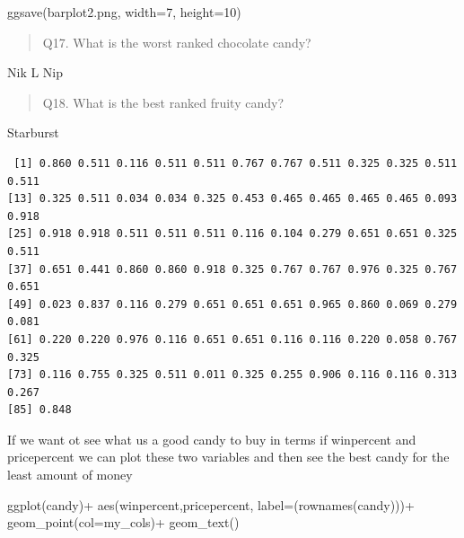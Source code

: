 \documentclass[
  letterpaper,
  DIV=11,
  numbers=noendperiod]{scrartcl}
\newenvironment{Shaded}{\begin{snugshade}}{\end{snugshade}}
\newcommand{\AttributeTok}[1]{\textcolor[rgb]{0.40,0.45,0.13}{#1}}
\newcommand{\DecValTok}[1]{\textcolor[rgb]{0.68,0.00,0.00}{#1}}
\newcommand{\FunctionTok}[1]{\textcolor[rgb]{0.28,0.35,0.67}{#1}}
\newcommand{\NormalTok}[1]{\textcolor[rgb]{0.00,0.23,0.31}{#1}}
\newcommand{\SpecialCharTok}[1]{\textcolor[rgb]{0.37,0.37,0.37}{#1}}
\newcommand{\StringTok}[1]{\textcolor[rgb]{0.13,0.47,0.30}{#1}}
\begin{document}
\begin{Shaded}
\begin{Highlighting}[]
\FunctionTok{ggsave}\NormalTok{(}\StringTok{\textquotesingle{}barplot2.png\textquotesingle{}}\NormalTok{, }\AttributeTok{width=}\DecValTok{7}\NormalTok{, }\AttributeTok{height=}\DecValTok{10}\NormalTok{)}
\end{Highlighting}
\end{Shaded}

\begin{quote}
Q17. What is the worst ranked chocolate candy?
\end{quote}

Nik L Nip

\begin{quote}
Q18. What is the best ranked fruity candy?
\end{quote}

Starburst

\begin{Shaded}
\end{Shaded}

\begin{verbatim}
 [1] 0.860 0.511 0.116 0.511 0.511 0.767 0.767 0.511 0.325 0.325 0.511 0.511
[13] 0.325 0.511 0.034 0.034 0.325 0.453 0.465 0.465 0.465 0.465 0.093 0.918
[25] 0.918 0.918 0.511 0.511 0.511 0.116 0.104 0.279 0.651 0.651 0.325 0.511
[37] 0.651 0.441 0.860 0.860 0.918 0.325 0.767 0.767 0.976 0.325 0.767 0.651
[49] 0.023 0.837 0.116 0.279 0.651 0.651 0.651 0.965 0.860 0.069 0.279 0.081
[61] 0.220 0.220 0.976 0.116 0.651 0.651 0.116 0.116 0.220 0.058 0.767 0.325
[73] 0.116 0.755 0.325 0.511 0.011 0.325 0.255 0.906 0.116 0.116 0.313 0.267
[85] 0.848
\end{verbatim}

If we want ot see what us a good candy to buy in terms if winpercent and
pricepercent we can plot these two variables and then see the best candy
for the least amount of money

\begin{Shaded}
\begin{Highlighting}[]
\FunctionTok{ggplot}\NormalTok{(candy)}\SpecialCharTok{+}
  \FunctionTok{aes}\NormalTok{(winpercent,pricepercent, }\AttributeTok{label=}\NormalTok{(}\FunctionTok{rownames}\NormalTok{(candy)))}\SpecialCharTok{+}
  \FunctionTok{geom\_point}\NormalTok{(}\AttributeTok{col=}\NormalTok{my\_cols)}\SpecialCharTok{+}
  \FunctionTok{geom\_text}\NormalTok{()}
\end{Highlighting}
\end{Shaded}
\end{document}
